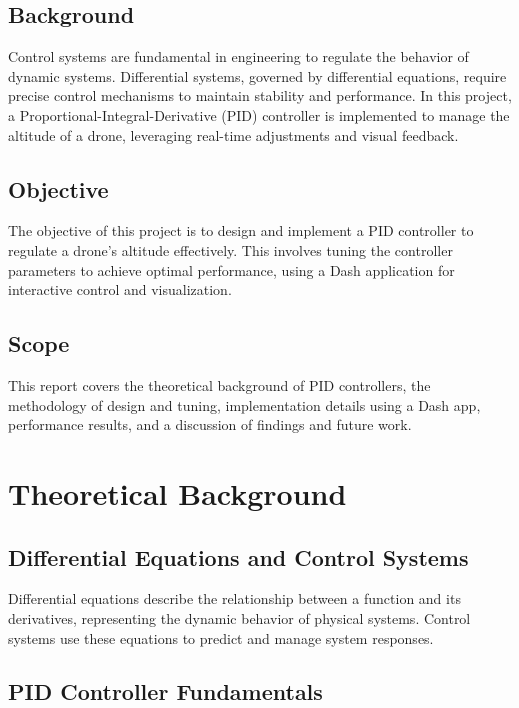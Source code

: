 \documentclass[a4paper,12pt]{article}
\begin{document}
\subsection{Background}

Control systems are fundamental in engineering to regulate the behavior of dynamic systems. Differential systems, governed by differential equations, require precise control mechanisms to maintain stability and performance. In this project, a Proportional-Integral-Derivative (PID) controller is implemented to manage the altitude of a drone, leveraging real-time adjustments and visual feedback.

\subsection{Objective}

The objective of this project is to design and implement a PID controller to regulate a drone's altitude effectively. This involves tuning the controller parameters to achieve optimal performance, using a Dash application for interactive control and visualization.

\subsection{Scope}

This report covers the theoretical background of PID controllers, the methodology of design and tuning, implementation details using a Dash app, performance results, and a discussion of findings and future work.

\section{Theoretical Background}

\subsection{Differential Equations and Control Systems}

Differential equations describe the relationship between a function and its derivatives, representing the dynamic behavior of physical systems. Control systems use these equations to predict and manage system responses.

\subsection{PID Controller Fundamentals}
\end{document}
